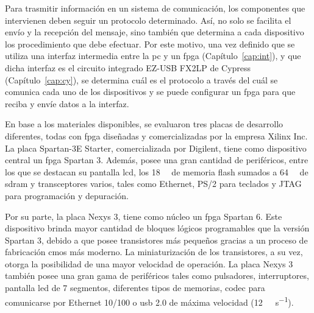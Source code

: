 
Para trasmitir información en un sistema de comunicación, los componentes que intervienen deben seguir un protocolo determinado. Así, no solo se facilita el envío y la recepción del mensaje, sino también que determina a cada dispositivo los procedimiento que debe efectuar. Por este motivo, una vez definido que se utiliza una interfaz intermedia entre la \acrshort{pc} y un \acrshort{fpga} (Capítulo~\ref{cap:int}), y que dicha interfaz es el circuito integrado EZ-USB FX2LP de Cypress (Capítulo~\ref{cap:cy}), se determina cuál es el protocolo a través del cuál se comunica cada uno de los dispositivos y se puede configurar un \acrshort{fpga} para que reciba y envíe datos a la interfaz.

En base a los materiales disponibles, se evaluaron tres placas de desarrollo diferentes, todas con \acrshort{fpga} diseñadas y comercializadas por la empresa Xilinx Inc. La placa Spartan-3E Starter, comercializada por Digilent, tiene como dispositivo central un \acrshort{fpga} Spartan 3. Además, posee una gran cantidad de periféricos, entre los que se destacan su pantalla \acrshort{lcd}, los \SI{18}{\mega\byte} de memoria flash sumados a \SI{64}{\mega\byte} de \acrshort{sdram} y transceptores varios, tales como Ethernet, PS/2 para teclados y JTAG para programación y depuración.

Por su parte, la placa Nexys 3, tiene como núcleo un \acrshort{fpga} Spartan 6. Este dispositivo brinda mayor cantidad de bloques lógicos programables que la versión Spartan 3, debido a que posee transistores más pequeños gracias a un proceso de fabricación \acrshort{cmos} más moderno. La miniaturización de los transistores, a su vez, otorga la posibilidad de una mayor velocidad de operación. La placa Nexys 3 también posee una gran gama de periféricos tales como pulsadores, interruptores, pantalla \acrshort{led} de 7 segmentos, diferentes tipos de memorias, \acrshort{codec} para comunicarse por Ethernet 10/100 o \acrshort{usb} 2.0 de máxima velocidad (\SI{12}{\mega\bit\per\second}).

